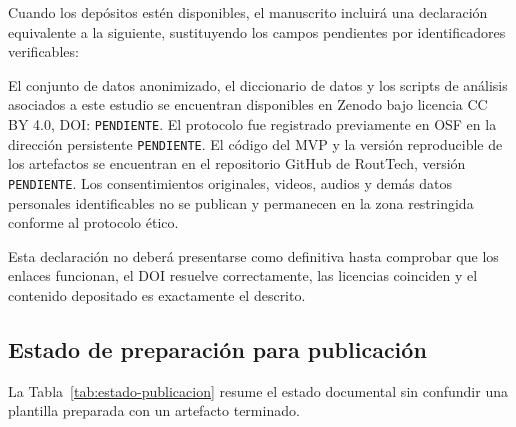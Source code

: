 \documentclass[12pt,a4paper]{article}
\begin{document}
Cuando los depósitos estén disponibles, el manuscrito incluirá una declaración equivalente a la siguiente, sustituyendo los campos pendientes por identificadores verificables:

\begin{tcolorbox}[
  colback=DocLighter,
  colframe=DocRule,
  boxrule=0.6pt,
  arc=1mm,
  title={Texto previsto para disponibilidad de datos y materiales},
  colbacktitle=DocLight,
  coltitle=DocText,
  fonttitle=\bfseries
]
El conjunto de datos anonimizado, el diccionario de datos y los scripts de análisis asociados a este estudio se encuentran disponibles en Zenodo bajo licencia CC BY 4.0, DOI: \texttt{PENDIENTE}. El protocolo fue registrado previamente en OSF en la dirección persistente \texttt{PENDIENTE}. El código del MVP y la versión reproducible de los artefactos se encuentran en el repositorio GitHub de RoutTech, versión \texttt{PENDIENTE}. Los consentimientos originales, videos, audios y demás datos personales identificables no se publican y permanecen en la zona restringida conforme al protocolo ético.
\end{tcolorbox}

Esta declaración no deberá presentarse como definitiva hasta comprobar que los enlaces funcionan, el DOI resuelve correctamente, las licencias coinciden y el contenido depositado es exactamente el descrito.

\subsection{Estado de preparación para publicación}

La Tabla~\ref{tab:estado-publicacion} resume el estado documental sin confundir una plantilla preparada con un artefacto terminado.
\end{document}
